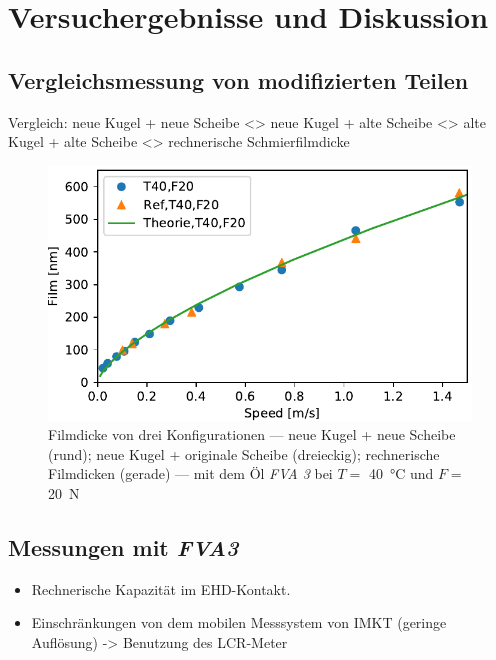 \chapter{Versuchergebnisse und Diskussion}
\label{chap:ergebnisse_und_diskussion}

\section{Vergleichsmessung von modifizierten Teilen}
\label{sec:vergleichsmessung_von_difizierten_Teilen}

Vergleich: neue Kugel + neue Scheibe <> neue Kugel + alte Scheibe <> alte Kugel + alte Scheibe <> rechnerische Schmierfilmdicke

\begin{figure}[htb]
    \centering
    \includegraphics[]{./images/vergleichsmessung_T40_F20_FVA3.pdf}
    \caption{Filmdicke von drei Konfigurationen --- neue Kugel + neue Scheibe (rund); neue Kugel + originale Scheibe (dreieckig); rechnerische Filmdicken (gerade) --- mit dem Öl \textit{FVA 3} bei $T =$ \SI{40}{\degreeCelsius} und $F =$ \SI{20}{\N}}
    \label{fig:vergleichsmessung}
\end{figure}

\section{Messungen mit \textit{FVA3}}
\label{sec:messungen_mit_fva3}

\begin{itemize}
    \item Rechnerische Kapazität im EHD-Kontakt.
    \item Einschränkungen von dem mobilen Messsystem von IMKT (geringe Auflösung) -> Benutzung des LCR-Meter
\end{itemize}

